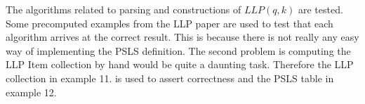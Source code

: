 The algorithms related to parsing and constructions of $LLP(q, k)$ are tested. Some precomputed examples from the LLP paper \cite{Vagner2007} are used to test that each algorithm arrives at the correct result. This is because there is not really any easy way of implementing the PSLS definition. The second problem is computing the LLP Item collection by hand would be quite a daunting task. Therefore the LLP collection in example 11. \cite[14]{Vagner2007} is used to assert correctness and the PSLS table in example 12. \cite[14]{Vagner2007}